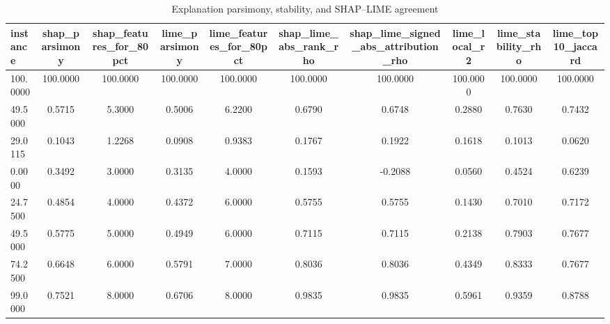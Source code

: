 \begin{table}
\centering
\caption{Explanation parsimony, stability, and SHAP--LIME agreement}
\label{tab:explanation_quality}
\begin{tabular}{lccccccccc}
\toprule
instance & shap_parsimony & shap_features_for_80pct & lime_parsimony & lime_features_for_80pct & shap_lime_abs_rank_rho & shap_lime_signed_abs_attribution_rho & lime_local_r2 & lime_stability_rho & lime_top10_jaccard \\
\midrule
100.0000 & 100.0000 & 100.0000 & 100.0000 & 100.0000 & 100.0000 & 100.0000 & 100.0000 & 100.0000 & 100.0000 \\
49.5000 & 0.5715 & 5.3000 & 0.5006 & 6.2200 & 0.6790 & 0.6748 & 0.2880 & 0.7630 & 0.7432 \\
29.0115 & 0.1043 & 1.2268 & 0.0908 & 0.9383 & 0.1767 & 0.1922 & 0.1618 & 0.1013 & 0.0620 \\
0.0000 & 0.3492 & 3.0000 & 0.3135 & 4.0000 & 0.1593 & -0.2088 & 0.0560 & 0.4524 & 0.6239 \\
24.7500 & 0.4854 & 4.0000 & 0.4372 & 6.0000 & 0.5755 & 0.5755 & 0.1430 & 0.7010 & 0.7172 \\
49.5000 & 0.5775 & 5.0000 & 0.4949 & 6.0000 & 0.7115 & 0.7115 & 0.2138 & 0.7903 & 0.7677 \\
74.2500 & 0.6648 & 6.0000 & 0.5791 & 7.0000 & 0.8036 & 0.8036 & 0.4349 & 0.8333 & 0.7677 \\
99.0000 & 0.7521 & 8.0000 & 0.6706 & 8.0000 & 0.9835 & 0.9835 & 0.5961 & 0.9359 & 0.8788 \\
\bottomrule
\end{tabular}
\end{table}
